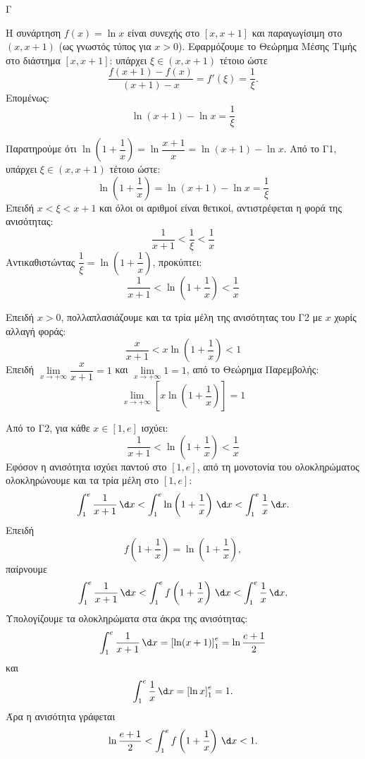 \begin{thema}{Γ}
\begin{erwthma}
\item Η συνάρτηση $f(x)=\ln x$ είναι συνεχής στο $[x,x+1]$ και παραγωγίσιμη στο $(x,x+1)$ (ως γνωστός τύπος για $x>0$). Εφαρμόζουμε το Θεώρημα Μέσης Τιμής στο διάστημα $[x,x+1]$: υπάρχει $\xi\in(x,x+1)$ τέτοιο ώστε
\[
\frac{f(x+1)-f(x)}{(x+1)-x}=f'(\xi)=\frac{1}{\xi}.
\]
Επομένως:
\[
\ln(x+1)-\ln x=\frac{1}{\xi}\]

\item Παρατηρούμε ότι $\ln\left(1+\dfrac{1}{x}\right)=\ln\dfrac{x+1}{x}=\ln(x+1)-\ln x$. Από το Γ1, υπάρχει $\xi\in(x,x+1)$ τέτοιο ώστε:
\[
\ln\left(1+\frac{1}{x}\right)=\ln(x+1)-\ln x=\frac{1}{\xi}
\]
Επειδή $x<\xi<x+1$ και όλοι οι αριθμοί είναι θετικοί, αντιστρέφεται η φορά της ανισότητας:
\[
\frac{1}{x+1}<\frac{1}{\xi}<\frac{1}{x}
\]
Αντικαθιστώντας $\dfrac{1}{\xi}=\ln\left(1+\dfrac{1}{x}\right)$, προκύπτει:
\[
\frac{1}{x+1}<\ln\left(1+\frac{1}{x}\right)<\frac{1}{x}
\]

\item Επειδή $x>0$, πολλαπλασιάζουμε και τα τρία μέλη της ανισότητας του Γ2 με $x$ χωρίς αλλαγή φοράς:
\[
\frac{x}{x+1}<x\ln\left(1+\frac{1}{x}\right)<1
\]
Επειδή $\lim\limits_{x\to +\infty}\dfrac{x}{x+1}=1$ και $\lim\limits_{x\to +\infty}1=1$, από το Θεώρημα Παρεμβολής:
\[
\lim_{x\to +\infty}\left[x\ln\left(1+\frac{1}{x}\right)\right]=1
\]

\item Από το Γ2, για κάθε $x\in[1,e]$ ισχύει:
\[
\frac{1}{x+1}<\ln\left(1+\frac{1}{x}\right)<\frac{1}{x}
\]
Εφόσον η ανισότητα ισχύει παντού στο $[1,e]$, από τη μονοτονία του ολοκληρώματος ολοκληρώνουμε και τα τρία μέλη στο $[1,e]$:
\[
\int_1^e \frac{1}{x+1}\,\d x
<
\int_1^e \ln\left(1+\frac{1}{x}\right)\,\d x
<
\int_1^e \frac{1}{x}\,\d x.
\]
Επειδή
\[
f\left(1+\frac{1}{x}\right)=\ln\left(1+\frac{1}{x}\right),
\]
παίρνουμε
\[
\int_1^e \frac{1}{x+1}\,\d x
<
\int_1^e f\left(1+\frac{1}{x}\right)\,\d x
<
\int_1^e \frac{1}{x}\,\d x.
\]
Υπολογίζουμε τα ολοκληρώματα στα άκρα της ανισότητας:
\[
\int_1^e \frac{1}{x+1}\,\d x
=
\left[\ln(x+1)\right]_1^e
=
\ln\frac{e+1}{2}
\]
και
\[
\int_1^e \frac{1}{x}\,\d x
=
\left[\ln x\right]_1^e
=1.
\]
Άρα η ανισότητα γράφεται
\[
\ln\frac{e+1}{2}
<
\int_1^e f\left(1+\frac{1}{x}\right)\,\d x
<
1.
\]
\end{erwthma}
\end{thema}
